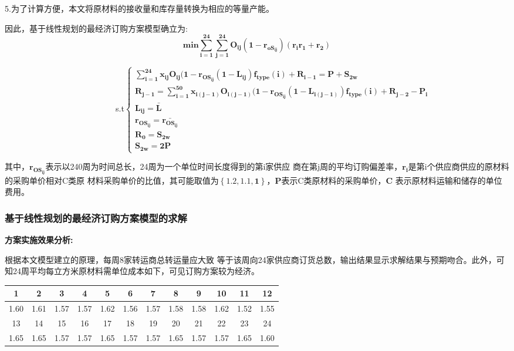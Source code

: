 \documentclass[UTF8]{ctexart}
\begin{document}
5.为了计算方便，本文将原材料的接收量和库存量转换为相应的等量产能。

因此，基于线性规划的最经济订购方案模型确立为:
\begin{equation}
	\mathbf{min\sum_{i=1}^{24} \sum_{j=1}^{24}O_{ij}(1-r_{oS_{ij}})(r_{i}r_{1}+r_{2})}
\end{equation}\par
~~~~~~~~~~~~~~~~~~~~~~~~~~~s.t$\mathbf{\begin{cases}
	\sum_{i=1}^{24}x_{ij}O_{ij}(1-r_{OS_{ij}}(1-L_{ij})f_{type}(i)+R_{i-1}=P+S_{2w}  \\
	R_{j-1}=\sum_{i=1}^{50}x_{i(j-1)}O_{i(j-1)}(1-r_{OS_{ij}}(1-L_{i(j-1)})f_{type}(i)+R_{j-2}-P_{i} \\
	L_{ij}=\bar{L}  \\
	r_{OS_{ij}}=\bar{r_{OS_{ij}}}  \\
	R_{0}=S_{2w}   \\
	S_{2w}=2P
	\end{cases}}$

其中，$\mathbf{r_{OS_{ij}}}$表示以240周为时间总长，24周为一个单位时间长度得到的第i家供应
商在第j周的平均订购偏差率，$\mathbf{r_{i}}$是第i个供应商供应的原材料的采购单价相对C类原
材料采购单价的比值，其可能取值为$\mathbf{\left \{1.2,1.1,1  \right \} }$，$\mathbf{P}$表示C类原材料的采购单价，$\mathbf{C}$
表示原材料运输和储存的单位费用。


\subsubsection{基于线性规划的最经济订购方案模型的求解}
\textbf{方案实施效果分析:}

根据本文模型建立的原理，每周8家转运商总转运量应大致
等于该周向24家供应商订货总数，输出结果显示求解结果与预期吻合。此外，可
知24周平均每立方米原材料需单位成本如下，可见订购方案较为经济。
\begin{center}
	\begin{tabular}{||c c c c c c c c c c c c||}
		\hline
		1 & 2 & 3 & 4 & 5 & 6 & 7 & 8 & 9 & 10 & 11 & 12     \\ [0.5ex]
		\hline
		1.60 & 1.61 & 1.57 & 1.57 & 1.62 & 1.56 & 1.57 & 1.58 & 1.58 & 1.62 & 1.52 & 1.55      \\
		\hline
		13 & 14 & 15 & 16 & 17 & 18 & 19 & 20 & 21 & 22 & 23 & 24      \\
		\hline
		1.65 & 1.65 & 1.57 & 1.57 & 1.65 & 1.57  & 1.57 & 1.65 & 1.57 & 1.57 & 1.65 & 1.60     \\
		\hline
	\end{tabular}
\end{center}
\end{document}
